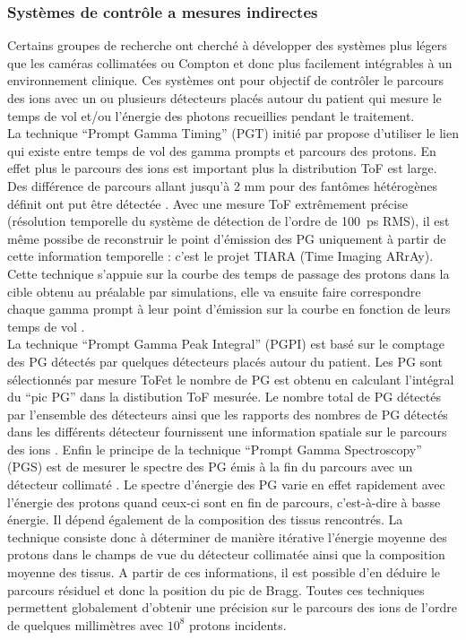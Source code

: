 \documentclass[11pt,a4paper,oldfontcommands]{memoir}
\begin{document}
\subsubsection{Systèmes de contrôle a mesures indirectes}
Certains groupes de recherche ont cherché à développer des systèmes plus légers que les caméras collimatées ou Compton et donc plus facilement intégrables à un environnement clinique. Ces systèmes ont pour objectif de contrôler le parcours des ions avec un ou plusieurs détecteurs placés autour du patient qui mesure le temps de vol et/ou l'énergie des photons recueillies pendant le traitement.\\
La technique \enquote{Prompt Gamma Timing} (PGT) initié par \cite{Golnik_2014} propose d'utiliser le lien qui existe entre temps de vol des gamma prompts et parcours des protons. En effet plus le parcours des ions est important plus la distribution ToF est large. Des différence de parcours allant jusqu'à 2 mm pour des fantômes hétérogènes définit ont put être détectée \cite{Hueso_Gonz_lez_2015}. Avec une mesure ToF extrêmement précise (résolution temporelle du système de détection de l'ordre de 100~ps RMS), il est même possibe de reconstruir le point d'émission des PG uniquement à partir de cette information temporelle : c'est le projet TIARA (Time Imaging ARrAy).  Cette technique s'appuie sur la courbe des temps de passage des protons dans la cible obtenu au préalable par simulations, elle va ensuite faire correspondre chaque gamma prompt à leur point d'émission sur la courbe en fonction de leurs temps de vol \cite{Marcatili_2019}.\\
La technique \enquote{Prompt Gamma Peak Integral} (PGPI) est basé sur le comptage des PG détectés par quelques détecteurs placés autour du patient. Les PG sont sélectionnés par mesure ToFet le nombre de PG est obtenu en calculant l'intégral du \enquote{pic PG} dans la distibution ToF mesurée. Le nombre total de PG détectés par l'ensemble des détecteurs ainsi que les rapports des nombres de PG détectés dans les différents détecteur fournissent une information spatiale sur le parcours des ions \cite{KrimmerPGPI}. 
Enfin le principe de la technique \enquote{Prompt Gamma Spectroscopy} (PGS) est de mesurer le spectre des PG émis à la fin du parcours avec un détecteur collimaté \cite{Testa_2014}. Le spectre d’énergie des PG varie en effet rapidement avec l’énergie des protons quand ceux-ci sont en fin de parcours, c’est-à-dire à basse énergie. Il dépend également de la composition des tissus rencontrés. La technique consiste donc à déterminer de manière itérative l’énergie moyenne des protons dans le champs de vue du détecteur collimatée ainsi que la composition moyenne des tissus. A partir de ces informations, il est possible d’en déduire le parcours résiduel et donc la position du pic de Bragg. Toutes ces techniques permettent globalement d’obtenir une précision sur le parcours des ions de l’ordre de quelques millimètres avec $10^8$ protons incidents.
\end{document}
